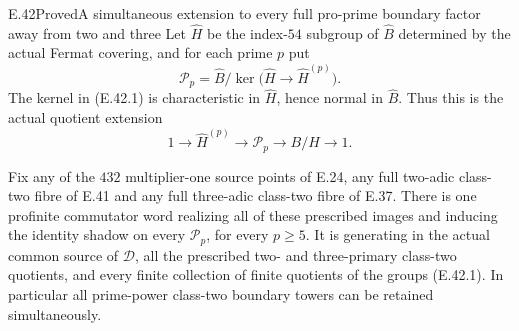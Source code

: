 \begin{statement}{E.42}{Proved}{A simultaneous extension to every full pro-prime boundary factor away from two and three}
Let $\widehat H$ be the index-$54$ subgroup
of $\widehat B$ determined by the actual
Fermat covering, and for each prime $p$ put
\[
 \mathscr P_p=
 \widehat B\big/
 \ker\bigl(\widehat H\longrightarrow
                    \widehat H^{(p)}\bigr).
 \tag{E.42.1}
\]
The kernel in \textup{(E.42.1)} is characteristic
in $\widehat H$, hence normal in $\widehat B$.
Thus this is the actual quotient extension
\[
 1\longrightarrow\widehat H^{(p)}
   \longrightarrow\mathscr P_p
   \longrightarrow B/H\longrightarrow1.
 \tag{E.42.2}
\]

Fix any of the $432$ multiplier-one source
points of E.24, any full two-adic class-two
fibre of E.41 and any full three-adic
class-two fibre of E.37.
There is one profinite commutator word
realizing all of these prescribed images
and inducing the identity shadow on
every $\mathscr P_p$, for every $p\ge5$.
It is generating in the actual common
source of $\mathscr D$, all the prescribed
two- and three-primary class-two quotients,
and every finite collection of finite
quotients of the groups
\textup{(E.42.1)}.
In particular all prime-power class-two
boundary towers can be retained
simultaneously.
\end{statement}
